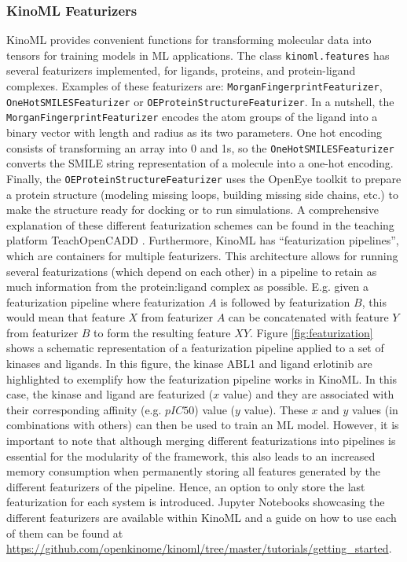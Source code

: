 \documentclass[9pt,lessons]{livecoms}
\begin{document}
\subsubsection{KinoML Featurizers}
KinoML provides convenient functions for transforming molecular data into tensors for training models in ML applications. The class \texttt{kinoml.features} has several featurizers implemented, for ligands, proteins, and protein-ligand complexes. Examples of these featurizers are: \texttt{MorganFingerprintFeaturizer}, \texttt{One\-Hot\-SMILES\-Featurizer} or \texttt{OEProteinStructureFeaturizer}. In a nutshell, the \texttt{MorganFingerprintFeaturizer} encodes the atom groups of the ligand into a binary vector with length and radius as its two parameters. One hot encoding consists of transforming an array into 0 and 1s, so the \texttt{OneHotSMILESFeaturizer} converts the SMILE string representation of a molecule into a one-hot encoding. Finally, the \texttt{OEProtein\-Structure\-Featurizer} uses the OpenEye toolkit to prepare a protein structure (modeling missing loops, building missing side chains, etc.) to make the structure ready for docking or to run simulations. 
A comprehensive explanation of these different featurization schemes can be found in the teaching platform TeachOpenCADD \cite{Backenkhler2023}. Furthermore, KinoML has ``featurization pipelines'', which are containers for multiple featurizers. This architecture allows for running several featurizations (which depend on each other) in a pipeline to retain as much information from the protein:ligand complex as possible. E.g. given a featurization pipeline where featurization $A$ is followed by featurization $B$, this would mean that feature $X$ from featurizer $A$ can be concatenated with feature $Y$ from featurizer $B$ to form the resulting feature $XY$. Figure \ref{fig:featurization} shows a schematic representation of a featurization pipeline applied to a set of kinases and ligands. In this figure, the kinase ABL1 and ligand erlotinib are highlighted to exemplify how the featurization pipeline works in KinoML. In this case, the kinase and ligand are featurized ($x$ value) and they are associated with their corresponding affinity (e.g. $pIC50$) value ($y$ value). These $x$ and $y$ values (in combinations with others) can then be used to train an ML model. However, it is important to note that although merging different featurizations into pipelines is essential for the modularity of the framework, this also leads to an increased memory consumption when permanently storing all features generated by the different featurizers of the pipeline. Hence, an option to only store the last featurization for each system is introduced. Jupyter Notebooks showcasing the different featurizers are available within KinoML and a guide on how to use each of them can be found at \url{https://github.com/openkinome/kinoml/tree/master/tutorials/getting_started}.\\
\end{document}

